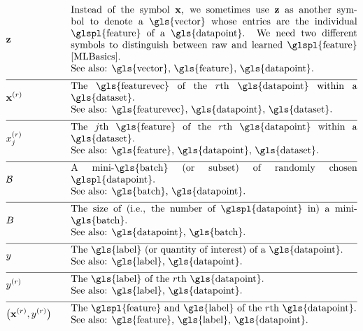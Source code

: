 \begin{align}
	&\rawfeaturevec &\quad &\parbox{.85\textwidth}{Instead of the symbol $\featurevec$, we 
		sometimes use $\rawfeaturevec$ as another symbol to denote a \gls{vector} whose entries 
		are the individual \glspl{feature} of a \gls{datapoint}. We need two 
		different symbols to distinguish between raw and learned \glspl{feature} \cite[Ch. 9]{MLBasics}.
		\\ See also: \gls{vector}, \gls{feature}, \gls{datapoint}. }\nonumber \\[2mm] \hline \nonumber\\[-5mm]
	&\featurevec^{(\sampleidx)} &\quad &\parbox{.85\textwidth}{The \gls{featurevec} of the $\sampleidx$th \gls{datapoint} within a \gls{dataset}.
		\\ See also: \gls{featurevec}, \gls{datapoint}, \gls{dataset}. } \nonumber \\[2mm] \hline \nonumber\\[-5mm]
	&\feature_{\featureidx}^{(\sampleidx)} &\quad &\parbox{.85\textwidth}{The $\featureidx$th \gls{feature} of the $\sampleidx$th 
		\gls{datapoint} within a \gls{dataset}.
		\\ See also: \gls{feature}, \gls{datapoint}, \gls{dataset}.} \nonumber \\[2mm] \hline \nonumber\\[-5mm]
	&\batch &\quad &\parbox{.85\textwidth}{A mini-\gls{batch} (or subset) of randomly chosen \glspl{datapoint}.
		\\ See also: \gls{batch}, \gls{datapoint}. }\nonumber \\[2mm] \hline \nonumber\\[-5mm]
	&\batchsize &\quad &\parbox{.85\textwidth}{The size of (i.e., the number of \glspl{datapoint} in) a mini-\gls{batch}.
		\\ See also: \gls{datapoint}, \gls{batch}. }\nonumber \\[2mm] \hline \nonumber\\[-5mm]
	&\truelabel &\quad &\parbox{.85\textwidth}{The \gls{label} (or quantity of interest) of a \gls{datapoint}.
		\\ See also: \gls{label}, \gls{datapoint}. } \nonumber \\[2mm] \hline \nonumber\\[-5mm]
	&\truelabel^{(\sampleidx)} &\quad &\parbox{.85\textwidth}{The \gls{label} of the $\sampleidx$th \gls{datapoint}.
		\\ See also: \gls{label}, \gls{datapoint}. } \nonumber \\[2mm] \hline \nonumber\\[-5mm]
	&\big(\featurevec^{(\sampleidx)},\truelabel^{(\sampleidx)}\big) &\quad &\parbox{.85\textwidth}{The \glspl{feature} and \gls{label} of the $\sampleidx$th \gls{datapoint}.
		\\ See also: \gls{feature}, \gls{label}, \gls{datapoint}. }\nonumber 
\end{align}                  


